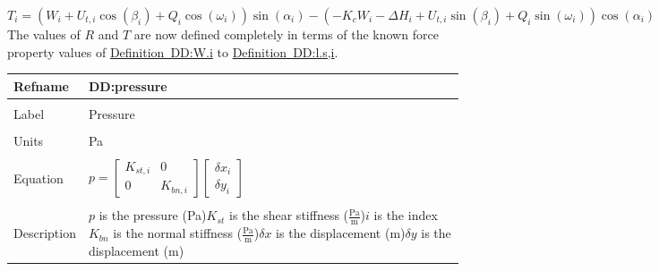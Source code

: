 \documentclass[12pt]{article}
\begin{document}
\begin{dmath}
T_{i}=\left(W_{i}+{U_{t,i}} \cos\left(β_{i}\right)+Q_{i} \cos\left(ω_{i}\right)\right) \sin\left(α_{i}\right)-\left(-{K_{c}} W_{i}-{ΔH}_{i}+{U_{t,i}} \sin\left(β_{i}\right)+Q_{i} \sin\left(ω_{i}\right)\right) \cos\left(α_{i}\right)
\end{dmath}
The values of $R$ and $T$ are now defined completely in terms of the known force property values of \hyperref[DD:W.i]{Definition~DD:W.i} to \hyperref[DD:l.s,i]{Definition~DD:l.s,i}.
~\newline
\noindent \begin{minipage}{\textwidth}
\begin{tabular}{p{} p{}}
\toprule \textbf{Refname} & \textbf{DD:pressure}
\label{DD:pressure}
\\ \midrule \\
Label & Pressure
\\ \midrule \\
Units & Pa
\\ \midrule \\
Equation & $p=\begin{bmatrix}
{K_{st,i}} & 0\\
0 & {K_{bn,i}}
\end{bmatrix} \begin{bmatrix}
{δx}_{i}\\
{δy}_{i}
\end{bmatrix}$
\\ \midrule \\
Description & $p$ is the pressure (Pa)\newline${K_{st}}$ is the shear stiffness ($\frac{\text{Pa}}{\text{m}}$)\newline$i$ is the index\newline${K_{bn}}$ is the normal stiffness ($\frac{\text{Pa}}{\text{m}}$)\newline$δx$ is the displacement (m)\newline$δy$ is the displacement (m)
\\ \bottomrule \end{tabular}
\end{minipage}\\
~\newline
\end{document}
